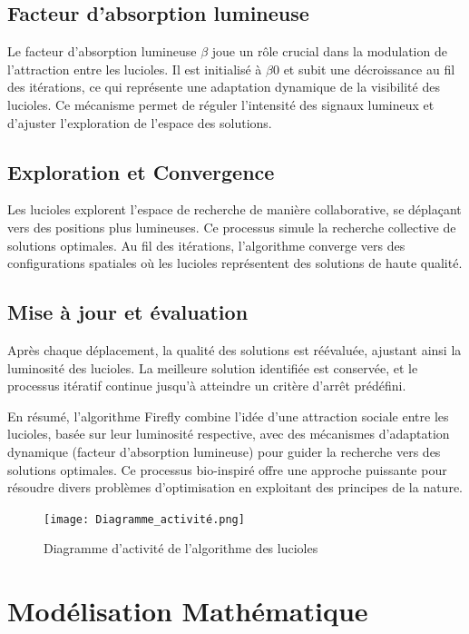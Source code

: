 \documentclass[conference]{IEEEtran}
\begin{document}
 \subsection{Facteur d'absorption lumineuse}
 Le facteur d'absorption lumineuse $\beta$ joue un rôle crucial dans la modulation de l'attraction entre les lucioles. Il est initialisé à $\beta$0  et subit une décroissance au fil des itérations, ce qui représente une adaptation dynamique de la visibilité des lucioles. Ce mécanisme permet de réguler l'intensité des signaux lumineux et d'ajuster l'exploration de l'espace des solutions.


\subsection{Exploration et Convergence}
Les lucioles explorent l'espace de recherche de manière collaborative, se déplaçant vers des positions plus lumineuses. Ce processus simule la recherche collective de solutions optimales. Au fil des itérations, l'algorithme converge vers des configurations spatiales où les lucioles représentent des solutions de haute qualité.

\subsection {Mise à jour et évaluation}
Après chaque déplacement, la qualité des solutions est réévaluée, ajustant ainsi la luminosité des lucioles. La meilleure solution identifiée est conservée, et le processus itératif continue jusqu'à atteindre un critère d'arrêt prédéfini.

En résumé, l'algorithme Firefly combine l'idée d'une attraction sociale entre les lucioles, basée sur leur luminosité respective, avec des mécanismes d'adaptation dynamique (facteur d'absorption lumineuse) pour guider la recherche vers des solutions optimales. Ce processus bio-inspiré offre une approche puissante pour résoudre divers problèmes d'optimisation en exploitant des principes de la nature.

\begin{figure}[ht]
  \centering
  \texttt{[image: Diagramme\_activité.png]}
  \caption{Diagramme d'activité de l'algorithme des lucioles}\cite{b1}
  \label{fig:enter-label}
\end{figure}

\section{Modélisation Mathématique}
\end{document}
